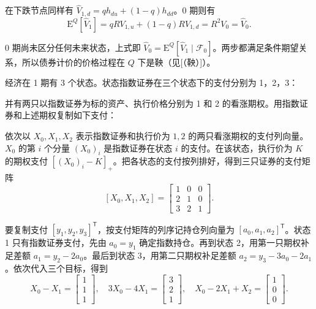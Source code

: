 \begin{solution}[blank-type=manual,blank-vsep=9\baselineskip]
\begin{enumerate}[label=(\alph*)]
 在下跌节点同样有 $\widehat V_{1,d}=qh_{du}+(1-q)h_{dd}$。0 期则有
 \[
 \mathrm E^Q[\widehat V_1]
 =qRV_{1,u}+(1-q)RV_{1,d}=R^2V_0=\widehat V_0.
 \]

 0 期尚未区分任何未来状态，上式即 $\widehat V_0=\mathrm E^Q[\widehat V_1\mid\mathcal F_0]$。两步都满足条件期望关系，所以债券计价的价格过程在 $Q$ 下是鞅\ifdefined\WJHandoutKnowledge（见[（鞅）]）\fi。
\end{enumerate}
\end{solution}

\begin{problem}
\begin{samepage}
\WJFiveProblem{} 经济在 1 期有 3 个状态。状态指数证券在三个状态下的支付分别为 1，2，3：
\begin{center}
\end{center}
并有两只以指数证券为标的资产、执行价格分别为 1 和 2 的看涨期权。用指数证券和上述期权复制如下支付：
\begin{center}
\qquad
{}
\qquad
{}
\end{center}
\end{samepage}
\end{problem}
\begin{solution}[blank-type=manual,blank-vsep=9\baselineskip]

依次以 $X_0,X_1,X_2$ 表示指数证券和执行价为 $1,2$ 的两只看涨期权的支付列向量。$X_0$ 的第 $i$ 个分量 $(X_0)_i$ 是指数证券在状态 $i$ 的支付。在该状态，执行价为 $K$ 的期权支付 $[(X_0)_i-K]_+$。把各状态的支付按列排好，得到三只证券的支付矩阵
\[
 [X_0,X_1,X_2]=\begin{bmatrix}1&0&0\\2&1&0\\3&2&1\end{bmatrix}.
\]

要复制支付 $[y_1,y_2,y_3]^{\mathsf T}$，按支付矩阵的列序记持仓列向量为 $[a_0,a_1,a_2]^{\mathsf T}$。状态 1 只有指数证券支付，先由 $a_0=y_1$ 确定指数持仓。再到状态 2，用第一只期权补足差额 $a_1=y_2-2a_0$。最后到状态 3，用第二只期权补足差额 $a_2=y_3-3a_0-2a_1$。依次代入三个目标，得到
\[
    X_{0}-X_{1}=\begin{bmatrix}1\\1\\1\end{bmatrix},\quad
    3X_{0}-4X_{1}=\begin{bmatrix}3\\2\\1\end{bmatrix},\quad
    X_{0}-2X_{1}+X_{2}=\begin{bmatrix}1\\0\\0\end{bmatrix}.
\]
\end{solution}

